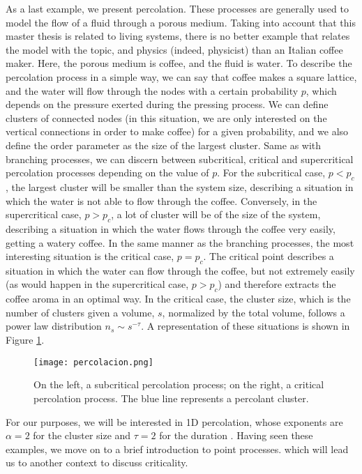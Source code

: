 As a last example, we present percolation. These processes are generally used to model the flow of a fluid through a porous medium. Taking into account that this master 
thesis is related to living systems, there is no better example that relates the model with the topic, and physics (indeed, physicist) than an Italian coffee maker. Here, the porous 
medium is coffee, and the fluid is water. To describe the percolation process in a simple way, we can say that coffee makes a square lattice, and the water will flow through the nodes 
with a certain probability $p$, which depends on the pressure exerted during the pressing process. 
We can define clusters of connected nodes (in this situation, we are only interested on the vertical connections in order to make coffee)
for a given probability, and we also define the order parameter as the size of the largest cluster. 
Same as with branching processes, we can discern between subcritical, critical and supercritical percolation processes depending on the value of $p$. For the subcritical case, $p<p_c$,
the largest cluster will be smaller than the system size, describing a situation in which the water is not able to flow through the coffee. Conversely, in the supercritical case, $p>p_c$,
a lot of cluster will be of the size of the system, describing a situation in which the water flows through the coffee very easily, getting a watery coffee. 
In the same manner as the branching processes, the most interesting situation is the critical case, $p=p_c$. The critical point describes a situation in which the water can flow through the
coffee, but not extremely easily (as would happen in the supercritical case, $p>p_c$) and therefore extracts the coffee aroma in an optimal way. In the critical case, the cluster size, which 
is the number of clusters given a volume, $s$, normalized by the total volume, follows a power law distribution $n_s\sim s^{-\tau}$.
A representation of these situations is shown in Figure \ref{f:percolation}.

\begin{figure}[H]
    \centering
    \texttt{[image: percolacion.png]}
    \caption{On the left, a subcritical percolation process; on the right, a critical percolation process. The blue line represents a percolant cluster.}
    \label{f:percolation}
\end{figure}
For our purposes, we will be interested in 1D percolation, whose exponents are $\alpha=2$ for the cluster size and $\tau=2$ for the duration \cite{stauffer2018introduction}. 
Having seen these examples, we move on to a brief introduction to point processes. which will lead us to another context to discuss criticality.

